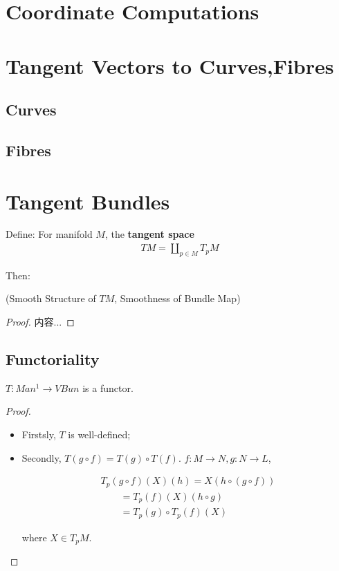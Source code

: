 \documentclass[Total.tex]{subfiles}
\begin{document}
		\section{Coordinate Computations}
		\section{Tangent Vectors to Curves,Fibres}
			\subsection{Curves}
			\subsection{Fibres}
		\section{Tangent Bundles}
			\begin{Def}
				Define: For manifold $M$, the \textbf{tangent space}
				\begin{gather*}
					T M=\coprod_{p\in M} T_p M
				\end{gather*}
			\end{Def}
			Then:
			\begin{proposition}
				(Smooth Structure of $TM$, Smoothness of Bundle Map)
			\end{proposition}
			\begin{proof}
				内容...
			\end{proof}
			\subsection{Functoriality}
			
			\begin{proposition}
				$T:Man^1\rightarrow VBun$ is a functor. 
			\end{proposition}
			\begin{proof}
				\begin{itemize}
					\item Firstsly, $T$ is well-defined;
					\item Secondly, $T(g\circ f)=T(g)\circ T(f)$. $f:M\rightarrow N,g:N\rightarrow L$,
					
					\begin{gather*}
						T_p(g\circ f)(X)(h)=X(h\circ (g\circ f))\\
						\qquad =T_p(f)(X)(h\circ g)\\
						\qquad =T_p(g)\circ T_p(f)(X)
					\end{gather*}
					
					where $X\in T_p M$. 
				\end{itemize}
			\end{proof}
			
\end{document}
